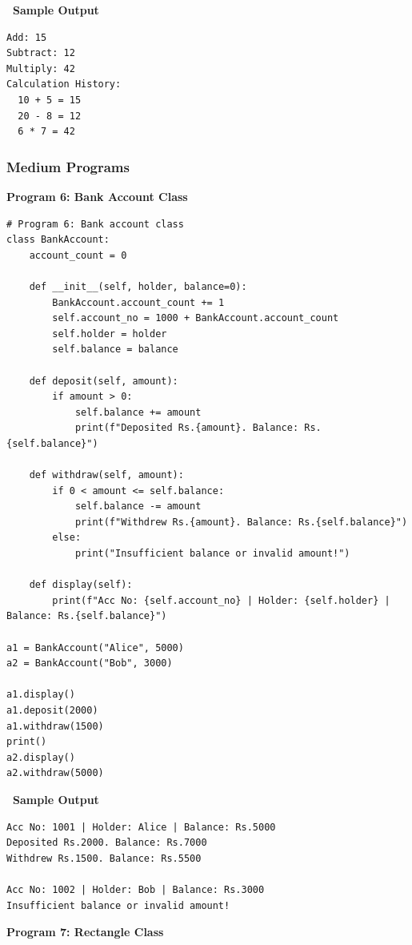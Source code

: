 \documentclass[12pt,a4paper]{article}
\newcommand{\outhead}{\noindent\colorbox{cmrgreen!25}%
  {\textbf{\small\color{cmrdark}~Sample Output~}}\par\vspace{-1pt}}
\begin{document}
\outhead
\begin{lstlisting}[style=outputstyle]
Add: 15
Subtract: 12
Multiply: 42
Calculation History:
  10 + 5 = 15
  20 - 8 = 12
  6 * 7 = 42
\end{lstlisting}

\subsubsection{Medium Programs}

\textbf{Program 6: Bank Account Class}

\begin{lstlisting}
# Program 6: Bank account class
class BankAccount:
    account_count = 0

    def __init__(self, holder, balance=0):
        BankAccount.account_count += 1
        self.account_no = 1000 + BankAccount.account_count
        self.holder = holder
        self.balance = balance

    def deposit(self, amount):
        if amount > 0:
            self.balance += amount
            print(f"Deposited Rs.{amount}. Balance: Rs.{self.balance}")

    def withdraw(self, amount):
        if 0 < amount <= self.balance:
            self.balance -= amount
            print(f"Withdrew Rs.{amount}. Balance: Rs.{self.balance}")
        else:
            print("Insufficient balance or invalid amount!")

    def display(self):
        print(f"Acc No: {self.account_no} | Holder: {self.holder} | Balance: Rs.{self.balance}")

a1 = BankAccount("Alice", 5000)
a2 = BankAccount("Bob", 3000)

a1.display()
a1.deposit(2000)
a1.withdraw(1500)
print()
a2.display()
a2.withdraw(5000)
\end{lstlisting}

\outhead
\begin{lstlisting}[style=outputstyle]
Acc No: 1001 | Holder: Alice | Balance: Rs.5000
Deposited Rs.2000. Balance: Rs.7000
Withdrew Rs.1500. Balance: Rs.5500

Acc No: 1002 | Holder: Bob | Balance: Rs.3000
Insufficient balance or invalid amount!
\end{lstlisting}

\vspace{0.5cm}

\textbf{Program 7: Rectangle Class}
\end{document}
